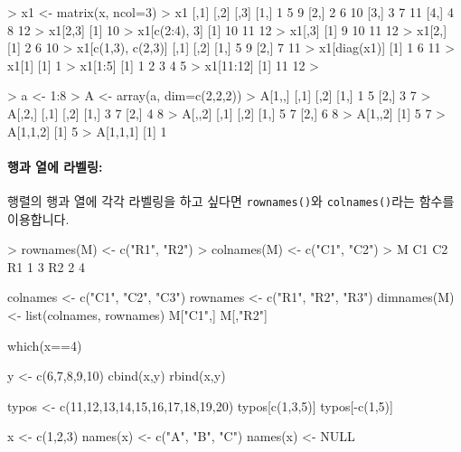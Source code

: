 \documentclass{book}
\begin{document}
\begin{Schunk}
\begin{Soutput}
> x1 <- matrix(x, ncol=3)
> x1
     [,1] [,2] [,3]
[1,]    1    5    9
[2,]    2    6   10
[3,]    3    7   11
[4,]    4    8   12
> x1[2,3]
[1] 10
> x1[c(2:4), 3]
[1] 10 11 12
> x1[,3]
[1]  9 10 11 12
> x1[2,]
[1]  2  6 10
> x1[c(1,3), c(2,3)]
     [,1] [,2]
[1,]    5    9
[2,]    7   11
> x1[diag(x1)]
[1]  1  6 11
> x1[1]
[1] 1
> x1[1:5]
[1] 1 2 3 4 5
> x1[11:12]
[1] 11 12
> 
\end{Soutput}
\end{Schunk}


\begin{Schunk}
\begin{Soutput}
> a <- 1:8
> A <- array(a, dim=c(2,2,2))
> A[1,,]
     [,1] [,2]
[1,]    1    5
[2,]    3    7
> A[,2,]
     [,1] [,2]
[1,]    3    7
[2,]    4    8
> A[,,2]
     [,1] [,2]
[1,]    5    7
[2,]    6    8
> A[1,,2]
[1] 5 7
> A[1,1,2]
[1] 5
> A[1,1,1]
[1] 1
\end{Soutput}
\end{Schunk}



\paragraph{행과 열에 라벨링:} 

행렬의 행과 열에 각각 라벨링을 하고 싶다면 \texttt{rownames()}와 \texttt{colnames()}라는 함수를 이용합니다.

\begin{Schunk}
\begin{Soutput}
> rownames(M) <- c("R1", "R2")
> colnames(M) <- c("C1", "C2")
> M
   C1 C2
R1  1  3
R2  2  4
\end{Soutput}
\end{Schunk}



\begin{Schunk}
\begin{Soutput}
colnames <- c("C1", "C2", "C3")
rownames <- c("R1", "R2", "R3")
dimnames(M) <- list(colnames, rownames)
M["C1",]
M[,"R2"]

\end{Soutput}
\end{Schunk}


\begin{Schunk}
\begin{Soutput}
which(x==4)

y <- c(6,7,8,9,10)
cbind(x,y)
rbind(x,y)

typos <- c(11,12,13,14,15,16,17,18,19,20)
typos[c(1,3,5)]
typos[-c(1,5)]

x <- c(1,2,3)
names(x) <- c("A", "B", "C")
names(x) <- NULL
\end{Soutput}
\end{Schunk}
\end{document}

